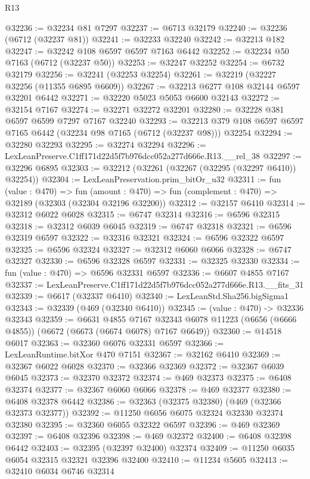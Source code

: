 \begin{lexlean}{R13}
\begin{coremodule}
@32236 := @32234 @81 @7297
@32237 := @6713 @32179
@32240 := @32236 (@6712 (@32237 @81))
@32241 := @32233 @32240
@32242 := @32213 @182
@32247 := @32242 @108 @6597 @6597 @7163 @6442
@32252 := @32234 @50 @7163 (@6712 (@32237 @50))
@32253 := @32247 @32252
@32254 := @6732 @32179
@32256 := @32241 (@32253 @32254)
@32261 := @32219 (@32227 @32256 (@11355 @6895 @6609))
@32267 := @32213 @6277 @108 @32144 @6597 @32201 @6442
@32271 := @32220 @5023 @5053 @6600 @32143
@32272 := @32154 @7167
@32274 := @32271 @32272 @32201
@32280 := @32228 @381 @6597 @6599 @7297 @7167 @32240
@32293 := @32213 @379 @108 @6597 @6597 @7165 @6442 (@32234 @98 @7165 (@6712 (@32237 @98))) @32254
@32294 := @32280 @32293
@32295 := @32274 @32294
@32296 := LexLeanPreserve.C1ff171d22d5f7b976dcc052a277d666e.R13.__rel_38
@32297 := @32296 @6895
@32303 := @32212 (@32261 (@32267 (@32295 (@32297 @6410)) @32254))
@32304 := LexLeanPreservation.prim_bitOr_u32
@32311 := fun (value : @470) =>
  fun (amount : @470) => fun (complement : @470) => @32189 (@32303 (@32304 @32196 @32200))
@32312 := @32157 @6410
@32314 := @32312 @6022 @6028
@32315 := @6747 @32314
@32316 := @6596 @32315
@32318 := @32312 @6039 @6045
@32319 := @6747 @32318
@32321 := @6596 @32319 @6597
@32322 := @32316 @32321
@32324 := @6596 @32322 @6597
@32325 := @6596 @32324
@32327 := @32312 @6060 @6066
@32328 := @6747 @32327
@32330 := @6596 @32328 @6597
@32331 := @32325 @32330
@32334 := fun (value : @470) => @6596 @32331 @6597
@32336 := @6607 @4855 @7167
@32337 := LexLeanPreserve.C1ff171d22d5f7b976dcc052a277d666e.R13.__fits_31
@32339 := @6617 (@32337 @6410)
@32340 := LexLeanStd.Sha256.bigSigma1
@32343 := @32339 (@469 (@32340 @6410))
@32345 := (value : @470) -> @32336 @32343
@32359 := @6631
    @4855
    @7167
    @32343
    @6078
    @11223
    (@6656 (@6666 @4855))
    (@6672 (@6673 (@6674 @6078) @7167 @6649))
@32360 := @14518 @6017
@32363 := @32360 @6076 @32331 @6597
@32366 := LexLeanRuntime.bitXor @470 @7151
@32367 := @32162 @6410
@32369 := @32367 @6022 @6028
@32370 := @32366 @32369
@32372 := @32367 @6039 @6045
@32373 := @32370 @32372
@32374 := @469 @32373
@32375 := @6408 @32374
@32377 := @32367 @6060 @6066
@32378 := @469 @32377
@32380 := @6408 @32378 @6442
@32386 := @32363 (@32375 @32380) (@469 (@32366 @32373 @32377))
@32392 := @11250 @6056 @6075 @32324 @32330 @32374 @32380
@32395 := @32360 @6055 @32322 @6597
@32396 := @469 @32369
@32397 := @6408 @32396
@32398 := @469 @32372
@32400 := @6408 @32398 @6442
@32403 := @32395 (@32397 @32400) @32374
@32409 := @11250 @6035 @6054 @32315 @32321 @32396 @32400
@32410 := @11234 @5605
@32413 := @32410 @6034 @6746 @32314

\end{coremodule}
\end{lexlean}
